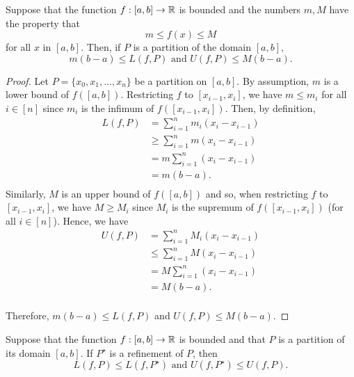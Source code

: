 \documentclass[letterpaper, twoside, 12pt]{book}
\begin{document}
\begin{lemma}[6.1]
  Suppose that the function \(f:[a,b]\to\mathbb R\) is bounded and the numbers
  \(m,M\) have the property that
  \[
    m\leq f(x)\leq M
  \]
  for all \(x\) in \([a,b]\). Then, if \(P\) is a partition of the domain
  \([a,b]\),
  \[
    m(b-a)\leq L(f,P)
      \text{ and }
    U(f,P)\leq M(b-a)
  .\]
\end{lemma}

\begin{proof}
    Let \(P = \{x_{0}, x_{1}, ..., x_{n}\}\) be a partition on \([a,b]\).
    By assumption, \(m\) is a lower bound of \(f([a,b])\). Restricting
    \(f\) to \([x_{i-1}, x_{i}]\), we have \(m \leq m_{i}\) for all \(i \in [n]\)
    since \(m_{i}\) is the infimum of \(f([x_{i-1}, x_{i}])\). Then, by definition,
    \begin{align*}
        L(f, P) &= \sum_{i = 1}^{n} m_{i}(x_{i} - x_{i-1}) \\ 
                &\geq \sum_{i = 1}^{n} m (x_{i} - x_{i-1}) \\
                &= m \sum_{i = 1}^{n} (x_{i} - x_{i-1}) \\
                &= m (b - a) .\\
    \end{align*}
    Similarly, \(M\) is an upper bound of \(f([a,b])\) and so, when restricting \(f\) 
    to \([x_{i-1}, x_{i}]\), we have \(M \geq M_{i}\) since \(M_{i}\) is the supremum of 
    \(f([x_{i-1}, x_{i}])\) (for all \(i \in [n]\)). Hence, we have
    \begin{align*}
        U(f, P) &= \sum_{i = 1}^{n} M_{i}(x_{i} - x_{i - 1}) \\
                &\leq \sum_{i = 1}^{n} M(x_{i} - x_{i - 1}) \\
                &= M \sum_{i = 1}^{n} (x_{i} - x_{i - 1}) \\
                &= M(b - a) .\\
    \end{align*}

    Therefore, \(m(b - a) \leq L(f, P)\) and \(U(f, P) \leq M(b - a) \). 
\end{proof}


\begin{lemma}
  Suppose that the function \(f:[a,b]\to\mathbb R\) is bounded and that \(P\)
  is a partition of its domain \([a,b]\). If \(P^\star\) is a refinement
  of \(P\), then
  \[
    L(f,P)\leq L(f,P^\star)
      \text{ and }
    U(f,P^\star)\leq U(f,P)
  .\]
\end{lemma}
\end{document}
